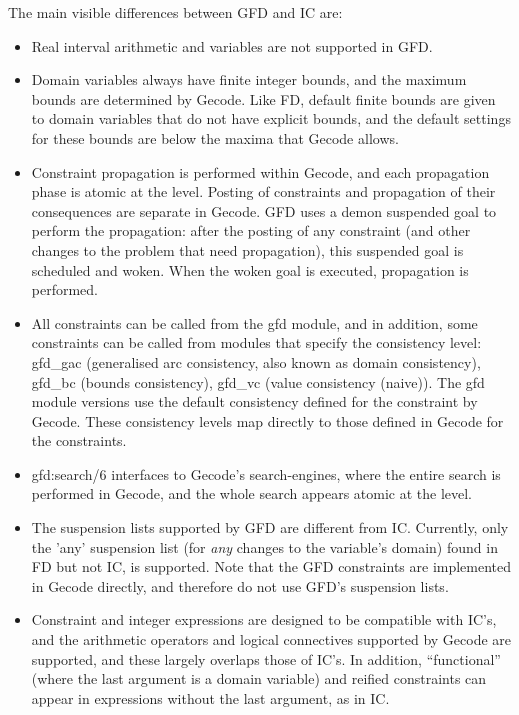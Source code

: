 The main visible differences between GFD and IC are:
\begin{itemize}
       \item Real interval arithmetic and variables are not supported in GFD.

       \item Domain variables always have finite integer bounds, and the maximum 
       bounds are
       determined by Gecode. Like FD, default finite bounds are given to 
       domain variables that do not have explicit bounds, and the default
       settings for these bounds are below the maxima that Gecode allows.

       \item Constraint propagation is performed within Gecode, and each propagation
       phase is atomic at the {\eclipse} level. Posting of constraints and 
       propagation of their consequences are separate in Gecode. GFD uses a
       demon suspended goal to perform the propagation: after the posting
       of any constraint (and other changes to the problem that need
       propagation), this suspended goal is scheduled and woken. When the
       woken goal is executed, propagation is performed. 

       \item All constraints can be called from the gfd module, and in
       addition, some constraints can be called from modules that specify
       the consistency level: gfd_gac (generalised arc consistency, also
       known as domain consistency), gfd_bc (bounds consistency), gfd_vc (value
       consistency (naive)). The gfd module versions use the 
       default consistency 
       defined for the constraint by Gecode. These consistency levels map
       directly to those defined in Gecode for the constraints.

       \item gfd:search/6 interfaces to Gecode's search-engines, where the
       entire search is performed in Gecode, and the whole search appears
       atomic at the {\eclipse} level. 

       \item The suspension lists supported by GFD are different from IC.
       Currently, only the 'any' suspension list (for {\em any} changes to the
       variable's domain) found in FD but not IC, is supported. Note that
       the GFD constraints are implemented in Gecode directly, and therefore
       do not use GFD's suspension lists. 

      \item Constraint and integer expressions are designed to be compatible with 
      IC's, and the arithmetic operators and logical connectives supported 
      by Gecode are supported, and these largely overlaps those of IC's.
      In addition, ``functional'' (where the last argument is a domain 
      variable) and reified constraints can appear in expressions without the
      last argument, as in IC.


\end{itemize}
